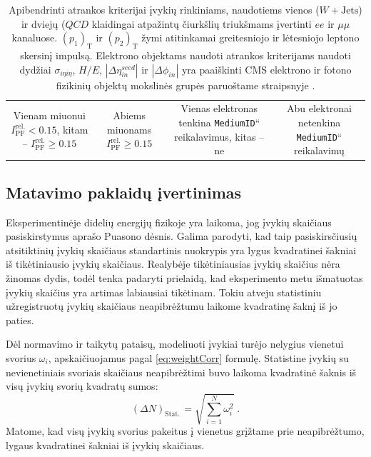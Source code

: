 \documentclass[a4paper, 12pt, oneside]{article}
\newcommand{\ttt}[1]{\texttt{#1}}
\newcommand{\WJets}{W\! +\!\mathrm{Jets}}
\newcommand{\ltq}[1]{{\quotedblbase{}#1\textquotedblleft{}}}
\newcommand{\QCD}{QC\! D}
\newlength\q
\begin{document}
\begin{table}[t]
\begin{tabular}{|c|c|c|c|}
		\hline
		\multirow{3}{9em}{\centering Vienam miuonui $I_{\mathrm{PF}}^{\mathrm{rel.}}<0.15$,
			kitam -- $I_{\mathrm{PF}}^{\mathrm{rel.}}\geqslant 0.15$} &
			\multirow{3}{7em}{\centering Abiems miuonams $I_{\mathrm{PF}}^{\mathrm{rel.}}\geqslant 0.15$} &
			\multirow{3}{10em}{\centering Vienas elektronas tenkina \ltq{\ttt{MediumID}} reikalavimus, kitas -- ne} &
			\multirow{3}{10em}{\centering Abu elektronai netenkina \ltq{\ttt{MediumID}} reikalavimų} \\
		 & & & \\
		 & & & \\
		\hline
	\end{tabular}
	\caption{\label{table:jetSelection} Apibendrinti atrankos kriterijai įvykių rinkiniams, naudotiems vienos ($\WJets$) ir
	dviejų ($\QCD$ klaidingai atpažintų čiurkšlių triukšmams įvertinti $ee$ ir $\mu\mu$ kanaluose.
	$(p_1)_\mathrm{T}$ ir $(p_2)_\mathrm{T}$ žymi atitinkamai greitesniojo ir lėtesniojo leptono skersinį impulsą.
	Elektrono objektams naudoti atrankos kriterijams naudoti dydžiai $\sigma_{i\eta i\eta}$, $H/E$, $|\Delta\eta_{in}^{seed}|$ ir
	$|\Delta\phi_{in}|$ yra paaiškinti CMS elektrono ir fotono fizikinių objektų mokslinės grupės paruoštame straipsnyje \cite{EleID}.}
\end{table}


\subsection{Matavimo paklaidų įvertinimas}\label{sec:uncertainties}
Eksperimentinėje didelių energijų fizikoje yra laikoma, jog įvykių skaičiaus pasiskirstymus aprašo Puasono dėsnis.
Galima parodyti, kad taip pasiskirsčiusių atsitiktinių įvykių skaičiaus standartinis nuokrypis yra lygus kvadratinei
šakniai iš tikėtiniausio įvykių skaičiaus.
Realybėje tikėtiniausias įvykių skaičius nėra žinomas dydis, todėl tenka padaryti prielaidą, kad eksperimento metu išmatuotas
įvykių skaičius yra artimas labiausiai tikėtinam.
Tokiu atveju statistiniu užregistruotų įvykių skaičiaus neapibrėžtumu laikome kvadratinę šaknį iš jo paties.

Dėl normavimo ir taikytų pataisų, modeliuoti įvykiai turėjo nelygius vienetui svorius $\omega_i$, apskaičiuojamus pagal
\eqref{eq:weightCorr} formulę.
Statistine įvykių su nevienetiniais svoriais skaičiaus neapibrėžtimi buvo laikoma kvadratinė šaknis iš visų įvykių svorių
kvadratų sumos:
\begin{equation}
	(\Delta N)_{\mathrm{Stat.\,}} = \sqrt{\sum_{i=1}^{N}\omega_{i}^{2}} \; .
	\label{eq:Sumw2Unc}
\end{equation}
Matome, kad visų įvykių svorius pakeitus į vienetus grįžtame prie neapibrėžtumo, lygaus kvadratinei šakniai iš įvykių
skaičiaus.
\end{document}
